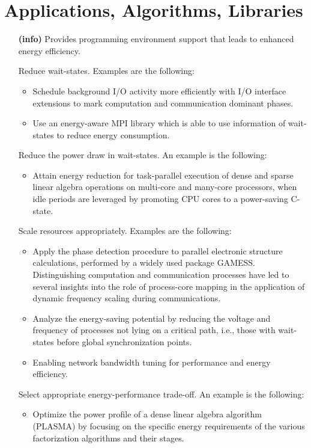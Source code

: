 \section{Applications, Algorithms, Libraries}
\begin{itemize}
\item[\textbf{(info)}]
Provides programming environment support that leads to enhanced energy efficiency.

Reduce wait-states. Examples are the following:

\begin{itemize}
\item
Schedule background I/O activity more efficiently with I/O interface extensions 
to mark computation and communication dominant phases. 
\item
Use an energy-aware MPI library which is able to use information of wait-states 
to reduce energy consumption.
\end{itemize}

Reduce the power draw in wait-states. An example is the following:

\begin{itemize}
\item
Attain energy reduction for task-parallel execution of dense and sparse linear algebra 
operations on multi-core and many-core processors, when idle periods are leveraged 
by promoting CPU cores to a power-saving C-state.
\end{itemize}

Scale resources appropriately. Examples are the following:
\begin{itemize}
\item
Apply the phase detection procedure to parallel electronic structure calculations, 
performed by a widely used package GAMESS. Distinguishing computation and communication 
processes have led to several insights into the role of process-core mapping in the 
application of dynamic frequency scaling during communications.
\item
Analyze the energy-saving potential by reducing the voltage and frequency of processes 
not lying on a critical path, i.e., those with wait-states before global synchronization points.
\item
Enabling network bandwidth tuning for performance and energy efficiency.
\end{itemize}

Select appropriate energy-performance trade-off. An example is the following:
\begin{itemize}
\item
Optimize the power profile of a dense linear algebra algorithm (PLASMA) by 
focusing on the specific energy requirements of the various factorization 
algorithms and their stages.
\end{itemize}


\end{itemize}

